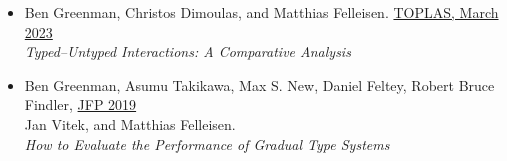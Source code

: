 \documentclass[11pt]{article}
\begin{document}
\begin{itemize}
\item
  Ben Greenman, Christos Dimoulas, and Matthias Felleisen. \hfill \href{https://dl.acm.org/doi/10.1145/3579833}{TOPLAS, March 2023} \\
  \emph{Typed--Untyped Interactions: A Comparative Analysis}
\item
  Ben Greenman, Asumu Takikawa, Max S. New, Daniel Feltey, Robert Bruce Findler, \hfill \href{https://www.cambridge.org/core/journals/journal-of-functional-programming/article/abs/how-to-evaluate-the-performance-of-gradual-type-systems/DC765724C52A3A462F16C7FB3AD18697}{JFP 2019} \\
  Jan Vitek, and Matthias Felleisen. \\
  \emph{How to Evaluate the Performance of Gradual Type Systems}
\end{itemize}
\end{document}
